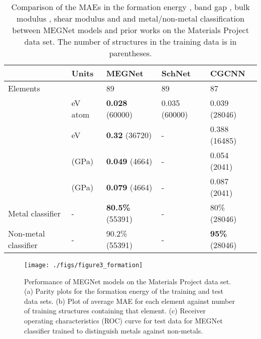 \documentclass[manuscript=article]{achemso}
\begin{document}
\begin{table}
  \caption{ \label{tbl:MEGNetperformancemp}Comparison of the MAEs in the formation energy , band gap , bulk modulus , shear modulus  and and metal/non-metal classification between MEGNet models and prior works on the Materials Project data set. The number of structures in the training data is in parentheses.}
  \begin{tabular}{lllll}
    \hline
      & Units & MEGNet &SchNet\cite{Schutt2018}  & CGCNN\cite{Xie2017}\\
    \hline
 Elements & & 89 & 89 & 87\\
  & eV atom & \textbf{0.028} (60000) & 0.035 (60000) & 0.039 (28046) \\
  & eV & \textbf{0.32} (36720) & - & 0.388 (16485) \\
  &  (GPa) & \textbf{0.049} (4664)& - & 0.054 (2041)\\
  &  (GPa) & \textbf{0.079} (4664) & - & 0.087 (2041)\\
 Metal classifier & - & \textbf{80.5\%} (55391) & - & 80\% (28046)\\
 Non-metal classifier & - & 90.2\% (55391)& - & \textbf{95\%} (28046)\\
    \hline
  \end{tabular}
\end{table}

\begin{figure}[htp]
\texttt{[image: ./figs/figure3\_formation]}
\caption{\label{fig:formation}Performance of MEGNet models on the Materials Project data set. (a) Parity plots for the formation energy of the training and test data sets. (b) Plot of average MAE for each element against number of training structures containing that element. (c) Receiver operating characteristics (ROC) curve for test data for MEGNet classifier trained to distinguish metals against non-metals. } 
\end{figure}
\end{document}
